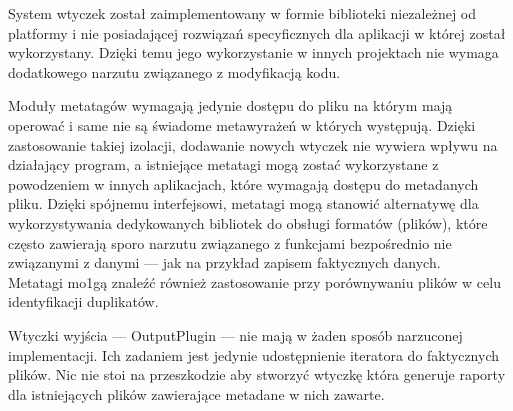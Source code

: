 \par
System wtyczek został zaimplementowany w formie biblioteki niezależnej od platformy i nie posiadającej rozwiązań specyficznych dla aplikacji w której został wykorzystany. Dzięki temu jego wykorzystanie w innych projektach nie wymaga dodatkowego narzutu związanego z modyfikacją kodu.

\par
Moduły metatagów wymagają jedynie dostępu do pliku na którym mają operować i same nie są świadome metawyrażeń w których występują. Dzięki zastosowanie takiej izolacji, dodawanie nowych wtyczek nie wywiera wpływu na działający program, a istniejące metatagi mogą zostać wykorzystane z powodzeniem w innych aplikacjach, które wymagają dostępu do metadanych pliku. Dzięki spójnemu interfejsowi, metatagi mogą stanowić alternatywę dla wykorzystywania dedykowanych bibliotek do obsługi formatów (plików), które często zawierają sporo narzutu związanego z funkcjami bezpośrednio nie związanymi z danymi --- jak na przykład zapisem faktycznych danych.\\
Metatagi mo1gą znaleźć również zastosowanie przy porównywaniu plików w celu identyfikacji duplikatów.

\par
Wtyczki wyjścia --- OutputPlugin --- nie mają w żaden sposób narzuconej implementacji. Ich zadaniem jest jedynie udostępnienie iteratora do faktycznych plików. Nic nie stoi na przeszkodzie aby stworzyć wtyczkę która generuje raporty dla istniejących plików zawierające metadane w nich zawarte.